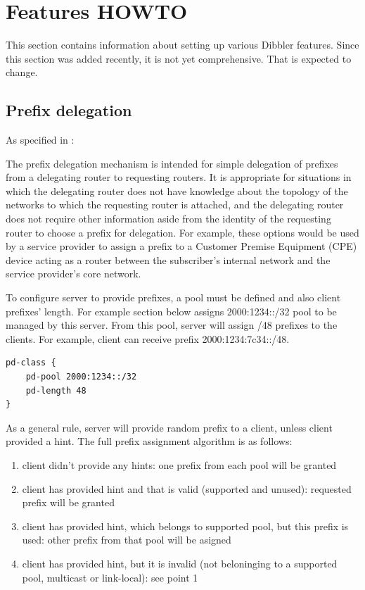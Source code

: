 \section{Features HOWTO}
This section contains information about setting up various Dibbler
features. Since this section was added recently, it is not yet
comprehensive. That is expected to change.

\subsection{Prefix delegation}
\label{features-prefix}
As specified in \cite{rfc3633}: \begin{emph}
   The prefix delegation mechanism is
   intended for simple delegation of prefixes from a delegating router
   to requesting routers.  It is appropriate for situations in which the
   delegating router does not have knowledge about the topology of the
   networks to which the requesting router is attached, and the
   delegating router does not require other information aside from the
   identity of the requesting router to choose a prefix for delegation.
   For example, these options would be used by a service provider to
   assign a prefix to a Customer Premise Equipment (CPE) device acting
   as a router between the subscriber's internal network and the service
   provider's core network. \end{emph}

To configure server to provide prefixes, a pool must be defined and
also client prefixes' length. For example section below assigns
2000:1234::/32 pool to be managed by this server. From this pool,
server will assign /48 prefixes to the clients. For example, client
can receive prefix 2000:1234:7c34::/48. 

\begin{lstlisting}
pd-class {
    pd-pool 2000:1234::/32
    pd-length 48
}
\end{lstlisting}

As a general rule, server will provide random prefix to a client,
unless client provided a hint. The full prefix assignment algorithm is
as follows:

\begin{enumerate}
\item client didn't provide any hints: one prefix from each pool will
  be granted
\item client has provided hint and that is valid (supported and
  unused): requested prefix will be granted
\item client has provided hint, which belongs to supported pool, but this prefix is used:
  other prefix from that pool will be asigned
\item client has provided hint, but it is invalid (not beloninging to
  a supported pool, multicast or link-local): see point 1
\end{enumerate}

